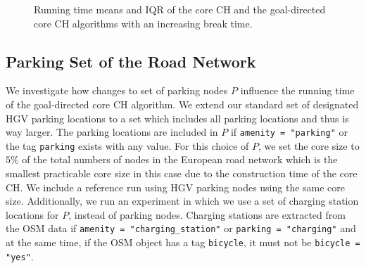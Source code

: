\begin{figure}[hbtp]
	\centering
	\hfill
	\caption{Running time means and IQR of the core CH and the goal-directed core CH algorithms with an increasing break time.}
	\label{fig:eval_break_time}
\end{figure}


\subsection{Parking Set of the Road Network}\label{sec:parking_set_exp}
We investigate how changes to set of parking nodes $P$ influence the running time of the goal-directed core CH algorithm. We extend our standard set of designated HGV parking locations to a set which includes all parking locations and thus is way larger. The parking locations are included in $P$ if  \texttt{amenity = "parking"} or the tag \texttt{parking} exists with any value. For this choice of $P$, we set the core size to $5\%$ of the total numbers of nodes in the European road network which is the smallest practicable core size in this case due to the construction time of the core CH. We include a reference run using HGV parking nodes using the same core size. Additionally, we run an experiment in which we use a set of charging station locations for $P$, instead of parking nodes. Charging stations are extracted from the OSM data if \texttt{amenity = "charging\_station"} or \texttt{parking = "charging"} and at the same time, if the OSM object has a tag \texttt{bicycle}, it must not be \texttt{bicycle = "yes"}.

